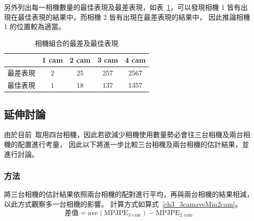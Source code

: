 另外列出每一相機數量的最佳表現及最差表現，如表~\ref{ch3_best_worst_camset}，可以發現相機 1 皆有出現在最佳表現的結果中，而相機 2 皆有出現在最差表現的結果中，
因此推論相機 1 的位置較為適當。
\begin{table}[!ht]
   \caption[相機組合的最差及最佳表現]{相機組合的最差及最佳表現}
   \centering
   \label{ch3_best_worst_camset}
   \setlength{\tabcolsep}{3pt}
   \renewcommand\arraystretch{1.5}
   \begin{tabular}{c|c|c|c|c}
       & 1 cam & 2 cam & 3 cam & 4 cam \\ 
      \midrule[2pt]
      最差表現 & 2 & 25 & 257 & 2567 \\
      最佳表現 & 1 & 18 & 137 & 1357 \\
   \end{tabular}
\end{table}

\subsection{延伸討論}
由於目前~\cite{zhang2020fusing}取用四台相機，因此若欲減少相機使用數量勢必會往三台相機及兩台相機的配置進行考量，
因此以下將進一步比較三台相機及兩台相機的估計結果，並進行討論。

\subsubsection{方法}
將三台相機的估計結果依照兩台相機的配對進行平均，再與兩台相機的結果相減，以此方式觀察多一台相機的影響。
計算方式如算式~\ref{ch3_3camaveMin2cam}。
\begin{equation}
   \label{ch3_3camaveMin2cam}
   \text{差值} = \text{ave}(\text{MPJPE}_{3 \text{ cam}})-\text{MPJPE}_{2 \text{ cam}}
\end{equation}

